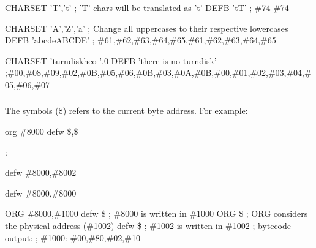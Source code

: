 
\begin{code}
CHARSET 'T','t'  ; 'T' chars will be translated as 't'
DEFB 'tT'        ; \#74 \#74
\end{code}


\begin{code}
CHARSET 'A','Z','a' ; Change all uppercases to their respective lowercases
DEFB 'abcdeABCDE'   ; \#61,\#62,\#63,\#64,\#65,\#61,\#62,\#63,\#64,\#65
\end{code}


\begin{code}
CHARSET 'turndiskheo ',0
DEFB 'there is no turndisk'
;\#00,\#08,\#09,\#02,\#0B,\#05,\#06,\#0B,\#03,\#0A,\#0B,\#00,\#01,\#02,\#03,\#04,\#05,\#06,\#07
\end{code}

\subsubsection{}

\begin{xen}
The symbols (\$) refers to the current byte address.  For example:
\end{xen}

\begin{code}
org \#8000
defw \$,\$
\end{code}

:

\begin{code}
defw \#8000,\#8002
\end{code}


\begin{code}
defw \#8000,\#8000
\end{code}


\begin{code}
ORG \#8000,\#1000
defw \$  ; \#8000 is written in \#1000
ORG \$   ; ORG considers the physical address (\#1002)
defw \$  ; \#1002 is written in \#1002
; bytecode output:
; \#1000: \#00,\#80,\#02,\#10
\end{code}
